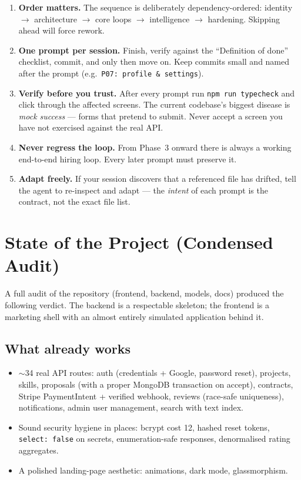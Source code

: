 \documentclass[11pt,a4paper]{article}
\begin{document}
\begin{enumerate}[leftmargin=1.6em]
  \item \textbf{Order matters.} The sequence is deliberately dependency-ordered:
        identity $\rightarrow$ architecture $\rightarrow$ core loops $\rightarrow$
        intelligence $\rightarrow$ hardening. Skipping ahead will force rework.
  \item \textbf{One prompt per session.} Finish, verify against the ``Definition of
        done'' checklist, commit, and only then move on. Keep commits small and named
        after the prompt (e.g.\ \texttt{P07: profile \& settings}).
  \item \textbf{Verify before you trust.} After every prompt run
        \texttt{npm run typecheck} and click through the affected screens. The current
        codebase's biggest disease is \emph{mock success} --- forms that pretend to
        submit. Never accept a screen you have not exercised against the real API.
  \item \textbf{Never regress the loop.} From Phase~3 onward there is always a working
        end-to-end hiring loop. Every later prompt must preserve it.
  \item \textbf{Adapt freely.} If your session discovers that a referenced file has
        drifted, tell the agent to re-inspect and adapt --- the \emph{intent} of each
        prompt is the contract, not the exact file list.
\end{enumerate}

\section{State of the Project (Condensed Audit)}

A full audit of the repository (frontend, backend, models, docs) produced the
following verdict. The backend is a respectable skeleton; the frontend is a
marketing shell with an almost entirely simulated application behind it.

\subsection{What already works}
\begin{itemize}[leftmargin=1.6em]
  \item $\sim$34 real API routes: auth (credentials + Google, password reset),
        projects, skills, proposals (with a proper MongoDB transaction on accept),
        contracts, Stripe PaymentIntent + verified webhook, reviews (race-safe
        uniqueness), notifications, admin user management, search with text index.
  \item Sound security hygiene in places: bcrypt cost 12, hashed reset tokens,
        \texttt{select:\,false} on secrets, enumeration-safe responses,
        denormalised rating aggregates.
  \item A polished landing-page aesthetic: animations, dark mode, glassmorphism.
\end{itemize}
\end{document}
